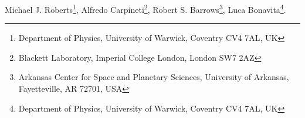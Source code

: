 Michael J. Roberts\footnote{\tiny{Department of Physics, University of Warwick, Coventry CV4 7AL, UK}}, Alfredo Carpineti\footnote{\tiny{Blackett Laboratory, Imperial College London, London SW7 2AZ}}, Robert S. Barrows\footnote{\tiny{Arkansas Center for Space and Planetary Sciences, University of Arkansas, Fayetteville, AR 72701, USA}}, Luca Bonavita\footnote{\tiny{Department of Physics, University of Warwick, Coventry CV4 7AL, UK}}. 